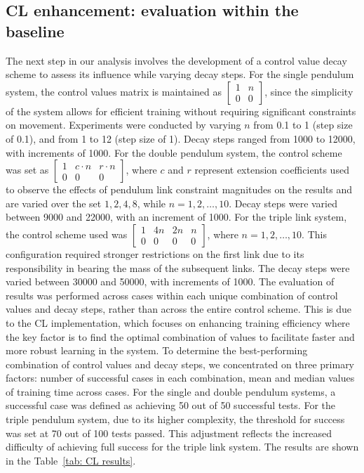 
\subsection{CL enhancement: evaluation within the baseline}

The next step in our analysis involves the development of a control value decay scheme to assess its influence while varying decay steps. For the single pendulum system, the control values matrix is maintained as \(\begin{bmatrix} 1 & n \\ 0 & 0 \end{bmatrix}\), since the simplicity of the system allows for efficient training without requiring significant constraints on movement. Experiments were conducted by varying $n$ from 0.1 to 1 (step size of 0.1), and from 1 to 12 (step size of 1). Decay steps ranged from 1000 to 12000, with increments of 1000. 
For the double pendulum system, the control scheme was set as \(\begin{bmatrix} 1 & c \cdot n & r \cdot n \\ 0 & 0 & 0 \end{bmatrix}\), where $c$ and $r$ represent extension coefficients used to observe the effects of pendulum link constraint magnitudes on the results and are varied over the set \({1, 2, 4, 8}\), while \(n = 1, 2, \ldots, 10\). Decay steps were varied between 9000 and 22000, with an increment of 1000. 
For the triple link system, the control scheme used was \(\begin{bmatrix} 1 & 4n & 2n & n \\ 0 & 0 & 0 & 0 \end{bmatrix}\), where \(n = 1, 2, \ldots, 10\). This configuration required stronger restrictions on the first link due to its responsibility in bearing the mass of the subsequent links. The decay steps were varied between 30000 and 50000, with increments of 1000.
The evaluation of results was performed across cases within each unique combination of control values and decay steps, rather than across the entire control scheme. This is due to the CL implementation, which focuses on enhancing training efficiency where the key factor is to find the optimal combination of values to facilitate faster and more robust learning in the system. To determine the best-performing combination of control values and decay steps, we concentrated on three primary factors: number of successful cases in each combination, mean and median values of training time across cases. For the single and double pendulum systems, a successful case was defined as achieving 50 out of 50 successful tests. For the triple pendulum system, due to its higher complexity, the threshold for success was set at 70 out of 100 tests passed. This adjustment reflects the increased difficulty of achieving full success for the triple link system. The results are shown in the Table~\ref{tab: CL results}.

